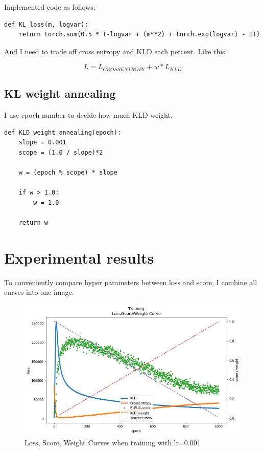 \documentclass[12pt]{article}
\begin{document}
Implemented code as follows:

\begin{verbatim}
def KL_loss(m, logvar):
    return torch.sum(0.5 * (-logvar + (m**2) + torch.exp(logvar) - 1))
\end{verbatim}

And I need to trade off cross entropy and KLD each percent. Like this:

\begin{equation}
L = L_{CROSSENTROPY} + w * L_{KLD}
\end{equation}

\subsection{KL weight annealing}

I use epoch number to decide how much KLD weight.

\begin{verbatim}
def KLD_weight_annealing(epoch):
    slope = 0.001
    scope = (1.0 / slope)*2
    
    w = (epoch % scope) * slope
    
    if w > 1.0:
        w = 1.0
    
    return w
\end{verbatim}

\section{Experimental results}

To conveniently compare hyper parameters between loss and score, I combine all curves into one image.

\begin{figure}[H]
\centering
\includegraphics[width=\linewidth]{Images/curvesv2.png} 
\caption{Loss, Score, Weight Curves when training with lr=0.001}
\end{figure}
\end{document}
